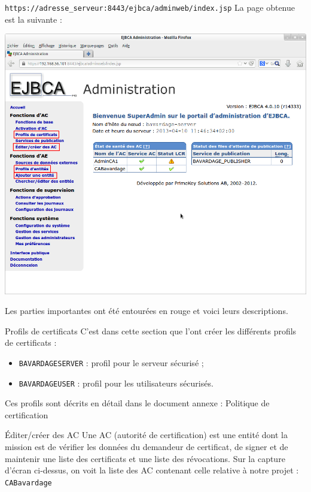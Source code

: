 \documentclass[a4paper,11pt,french]{book}
\begin{document}
\verb+https://adresse_serveur:8443/ejbca/adminweb/index.jsp+
\newpage
La page obtenue est la suivante :
\begin{center}
\includegraphics[width=40em]{admin_ejbca.png}
\end{center}

Les parties importantes ont été entourées en rouge et voici leurs descriptions.

\begin{paragraph}{Profils de certificats}
C'est dans cette section que l'ont créer les différents profils de certificats :
\begin{itemize}
\item \verb+BAVARDAGESERVER+ : profil pour le serveur sécurisé ;
\item \verb+BAVARDAGEUSER+ : profil pour les utilisateurs sécurisés.
\end{itemize}

Ces profils sont décrits en détail dans le document annexe : Politique de certification
\end{paragraph}

\begin{paragraph}{Éditer/créer des AC}
Une AC (autorité de certification) est une entité dont la mission est de vérifier les données du demandeur de certificat, de signer et de maintenir une liste des certificats et une liste des révocations. Sur la capture d'écran ci-dessus, on voit la liste des AC contenant celle relative à notre projet : \verb+CABavardage+
\end{paragraph}
\end{document}
